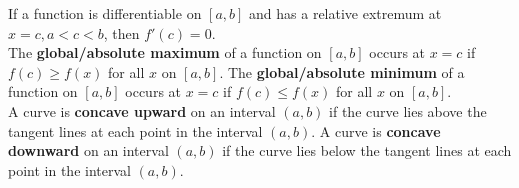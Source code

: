         \noindent If a function is differentiable on $[a,b]$ and has a relative extremum at $
        x=c, a<c<b$, then $f'(c)=0$. \\

        \noindent The \textbf{global/absolute maximum} of a function on $[a,b]$ occurs at $x=c$
        if $f(c)\geq f(x)$ for all $x$ on $[a,b]$. The \textbf{global/absolute minimum} of a
        function on $[a,b]$ occurs at $x=c$ if $f(c)\leq f(x)$ for all $x$ on $[a,b]$. \\

        \noindent A curve is \textbf{concave upward} on an interval $(a,b)$ if the curve lies
        above the tangent lines at each point in the interval $(a,b)$. A curve is
        \textbf{concave downward} on an interval $(a,b)$ if the curve lies below the tangent
        lines at each point in the interval $(a,b)$. \\

